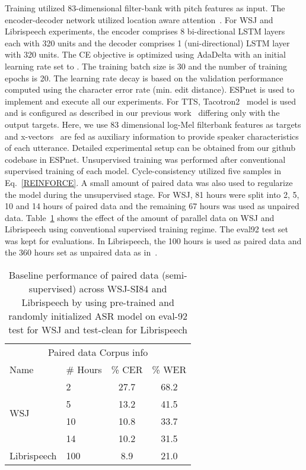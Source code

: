 \documentclass[a4paper]{article}
\begin{document}
Training utilized 83-dimensional filter-bank with pitch features as input. 
The encoder-decoder network utilized location aware attention~\cite{bahdanau2016end}. For WSJ and Librispeech experiments, the encoder comprises 8 bi-directional LSTM layers~\cite{schuster1997bidirectional,hochreiter1997long} each with 320 units and the decoder comprises 1 (uni-directional) LSTM layer with 320 units. The CE objective is optimized using AdaDelta \cite{zeilerAdaDelta} with an initial learning rate set to . The training batch size is 30 and the number of training epochs is 20. The learning rate decay is based on the validation performance computed using the character error rate (min. edit distance). ESPnet \cite{watanabe2018espnet} is used to implement and execute all our experiments.
For TTS, Tacotron2~\cite{shen2018natural} model is used and is configured as described in our previous work~\cite{hori2018cycle} differing only with the output targets. Here, we use 83 dimensional log-Mel filterbank features as targets and x-vectors~\cite{snyder2018x} are fed as auxiliary information to provide speaker characteristics of each utterance.
Detailed experimental setup can be obtained from our github codebase in ESPnet. Unsupervised training was performed after conventional supervised training of each model.
Cycle-consistency utilized five samples in Eq.~\ref{REINFORCE}. A small amount of paired data was also used to regularize the model during the unsupervised stage. For WSJ, 81 hours were split into 2, 5, 10 and 14 hours of paired data and the remaining 67 hours was used as unpaired data. Table~\ref{tab:pretrain} shows the effect of the amount of parallel data on WSJ and Librispeech using conventional supervised training regime. The eval92 test set was kept for evaluations. In Librispeech, the 100 hours is used as paired data and the 360 hours set as unpaired data as in~\cite{hori2018cycle}. 
\begin{table}[H]
\caption{Baseline performance of paired data (semi-supervised) across WSJ-SI84 and Librispeech by using pre-trained and randomly initialized ASR model on eval-92 test for WSJ and test-clean for Librispeech}\label{tab:pretrain}
\centering{}{\footnotesize{}}\begin{tabular}{llcc}
\hline 
\multicolumn{4}{c}{{\footnotesize{}Paired data Corpus info  }}\tabularnewline
{\footnotesize{}Name} & {\footnotesize{}\# Hours} & {\footnotesize{}\% CER} & {\footnotesize{}\% WER}\tabularnewline
\hline 
\hline 
\multirow{4}{*}{{\footnotesize{}WSJ}} & {\footnotesize{}2} & {\footnotesize{}27.7} & {\footnotesize{}68.2}\tabularnewline
 & {\footnotesize{}5} & {\footnotesize{}13.2} & {\footnotesize{}41.5}\tabularnewline
 & {\footnotesize{}10} & {\footnotesize{}10.8} & {\footnotesize{}33.7}\tabularnewline
 & {\footnotesize{}14} & {\footnotesize{}10.2} & {\footnotesize{}31.5}\tabularnewline
{\footnotesize{}Librispeech} & {\footnotesize{}100} & {\footnotesize{}8.9} & {\footnotesize{}21.0}\tabularnewline
\hline 
\end{tabular}{\footnotesize \par}
\end{table}
\end{document}
